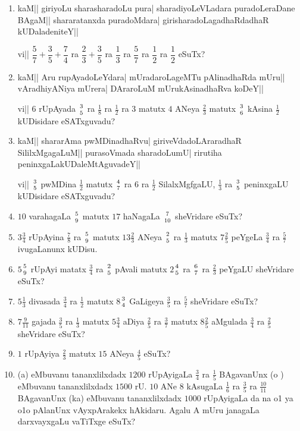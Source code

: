 \begin{enumerate}[\rm(1)]
\item kaM|| giriyoLu sharasharadoLu pura| sharadiyoLeVLadara puradoLeraDane BAgaM|| shararatanxda puradoMdara| girisharadoLagadhaRdadhaR kUDaladeniteY||

vi|| $\dfrac{5}{7}+\dfrac{3}{5}+\dfrac{7}{4}$ ra $\dfrac{2}{3} + \dfrac{3}{5}$ ra $\dfrac{1}{3}$ ra $\dfrac{5}{7}$ ra $\dfrac{1}{2}$ ra $\dfrac{1}{2}$ eSuTx?

\item kaM|| Aru rupAyadoLeYdara| mUradaroLageMTu pAlinadhaRda mUru|| vAradhiyANiya mUrera| DAraroLuM mUrukAsinadhaRva koDeY||

vi|| $6$ rUpAyada ${3}\above 0pt{5}$ ra $\tfrac{1}{8}$ ra $\tfrac{1}{2}$ ra $3$ matutx $4$ ANeya $\tfrac{2}{3}$ matutx ${3} \above 0pt {6}$ kAsina $\tfrac{1}{2}$ kUDisidare eSATxguvadu?

\item kaM|| shararAma pwMDinadhaRvu| giriveVdadoLAraradhaR SililxMgagaLuM|| purasoVmada sharadoLumU| rirutiha peninxgaLakUDaleMtAguvadeY||

vi|| ${3} \above 0pt {5}$ pwMDina $\tfrac{1}{2}$ matutx ${4}\above 0pt {7}$ ra $6$ ra $\tfrac{1}{2}$ SilalxMgfgaLU, $\tfrac{1}{3}$ ra ${3}\above 0pt{5}$ peninxgaLU kUDisidare eSATxguvadu?

\item $10$ varahagaLa ${5}\above 0pt {9}$ matutx $17$ haNagaLa ${7}\above 0pt {10}$ sheVridare eSuTx?

\item $3\tfrac{3}{4}$ rUpAyina $\tfrac{7}{8}$ ra ${5}\above 0pt{9}$ matutx $13\tfrac{2}{3}$ ANeya ${2}\above 0pt {5}$ ra $\tfrac{1}{3}$ matutx $7\tfrac{2}{5}$ peYgeLa $\tfrac{3}{4}$ ra $\tfrac{5}{7}$ ivugaLanunx kUDisu.

\item $5$${5} \above 0pt{9}$ rUpAyi matatx $\tfrac{3}{4}$ ra ${2}\above 0pt{5}$ pAvali matutx $2$${4}\above 0pt{5}$ ra ${6}\above 0pt{7}$ ra $\tfrac{2}{3}$ peYgaLU sheVridare eSuTx?

\item $5\tfrac{1}{3}$  divasada $\tfrac{3}{4}$ ra $\tfrac{1}{2}$ matutx $8$${3}\above 0pt{4}$ GaLigeya $\tfrac{3}{5}$ ra $\tfrac{5}{7}$ sheVridare eSuTx?

\item $7\tfrac{9}{11}$ gajada $\tfrac{3}{5}$ ra $\tfrac{1}{3}$ matutx $5\tfrac{3}{4}$ aDiya $\tfrac{2}{5}$ ra $\tfrac{3}{7}$ matutx $8\tfrac{2}{5}$ aMgulada $\tfrac{3}{4}$ ra $\tfrac{2}{5}$ sheVridare eSuTx?

\item $1$ rUpAyiya $\tfrac{2}{3}$ matutx $15$ ANeya $\tfrac{4}{5}$ eSuTx?

\item (a) eMbuvanu tananxlilxdadx $1200$ rUpAyigaLa $\tfrac{3}{4}$ ra $\tfrac{1}{5}$ BAgavanUnx (o
) eMbuvanu tananxlilxdadx $1500$ rU. $10$ ANe $8$ kAsugaLa $\tfrac{1}{6}$ ra $\tfrac{3}{5}$ ra $\tfrac{10}{11}$ BAgavanUnx (ka) eMbuvanu tananxlilxdadx $1000$ rUpAyigaLa \MU da \SU na {\rm o1
\RU}ya\; {\rm o1o}\; pAlanUnx vAyxpArakekx hAkidaru. Agalu A mUru janagaLa darxvayxgaLu vaTiTxge eSuTx?

\end{enumerate}
